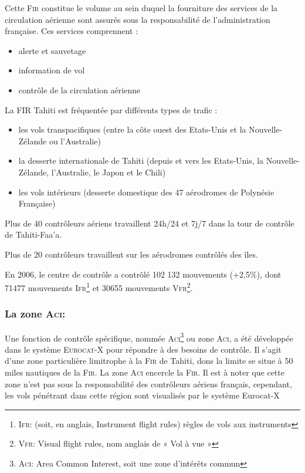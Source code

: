 Cette \textsc{Fir} constitue le volume au sein duquel la fourniture des services de la circulation aérienne sont assurés sous la responsabilité de l'administration française. Ces services comprennent :
\begin{itemize}
    \item alerte et sauvetage
    \item information de vol
    \item contrôle de la circulation aérienne
\end{itemize}\medskip
La FIR Tahiti est fréquentée par différents types de trafic :
\begin{itemize}
    \item les vols transpacifiques (entre la côte ouest des Etats-Unis et la Nouvelle-Zélande ou l'Australie)
    \item la desserte internationale de Tahiti (depuis et vers les Etats-Unis, la Nouvelle-Zélande, l'Australie, le Japon et le Chili)
    \item les vols intérieurs (desserte domestique des 47 aérodromes de Polynésie Française)
\end{itemize}\medskip

Plus de 40 contrôleurs aériens travaillent 24h/24 et 7j/7 dans la tour de contrôle de Tahiti-Faa'a.

Plus de 20 contrôleurs travaillent sur les aérodromes contrôlés des îles.

En 2006, le centre de contrôle a contrôlé 102 132 mouvements (+2,5\%), dont 71477 mouvements \textsc{Ifr}\footnote{\textsc{Ifr}: (soit, en anglais, Instrument flight rules) règles de vols aux instruments} et 30655 mouvements \textsc{Vfr}\footnote{\textsc{Vfr}: Visual flight rules, nom anglais de « Vol à vue »}.

        \subsubsection{La zone \textsc{Aci}:\label{Aci}}
Une fonction de contrôle spécifique, nommée \textsc{Aci}\footnote{\textsc{Aci}: Area Common Interest, soit une zone d'intérêts commun} ou zone \textsc{Aci}, a été développée dans le système \textsc{Eurocat-X} pour répondre à des besoins de contrôle. Il s’agit d’une zone particulière limitrophe à la \textsc{Fir}  de Tahiti, dons la limite se situe à 50 miles nautiques de la \textsc{Fir}. La zone \textsc{Aci} encercle la \textsc{Fir}. Il est à noter que cette zone n’est pas sous la responsabilité des contrôleurs aériens français, cependant, les vols pénétrant dans cette région sont visualisés par le système Eurocat-X 

